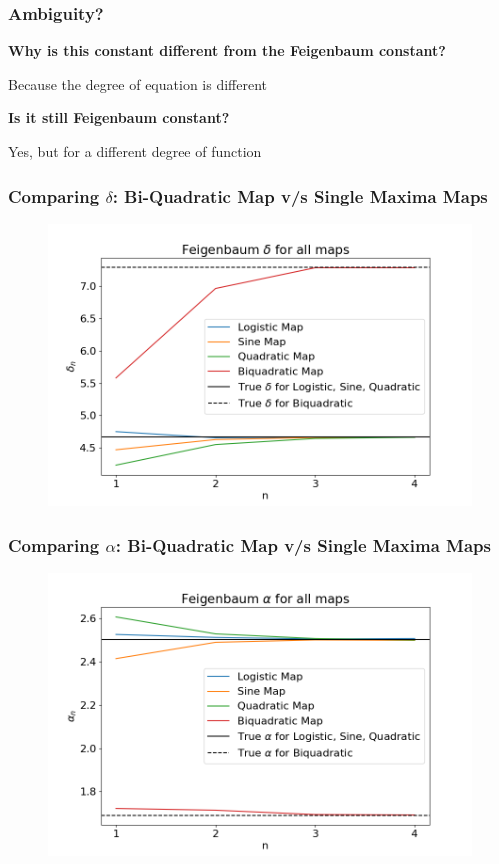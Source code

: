 \documentclass[
	11pt, %
	aspectratio=169, %
]{beamer}
\begin{document}

\begin{frame}
        \frametitle{Ambiguity?}
        \begin{center}
        \item \textbf{\large{Why is this constant different from the Feigenbaum constant?}} \pause
        \item Because the degree of equation is different
        \item \textbf{\large{Is it still Feigenbaum constant?}} \pause
        \item Yes, but for a different degree of function
        \end{center}

\end{frame}


\begin{frame}
        \frametitle{Comparing $\delta$: Bi-Quadratic Map v/s Single Maxima Maps}
        \begin{figure}
            \includegraphics[width=0.6\linewidth]
            {feigenbaum_deltas.png}
        \end{figure}
\end{frame}


\begin{frame}
        \frametitle{Comparing $\alpha$: Bi-Quadratic Map v/s Single Maxima Maps}
        \begin{figure}
            \includegraphics[width=0.6\linewidth]
            {feigenbaum_alphas.png}
        \end{figure}
\end{frame}
\end{document}
